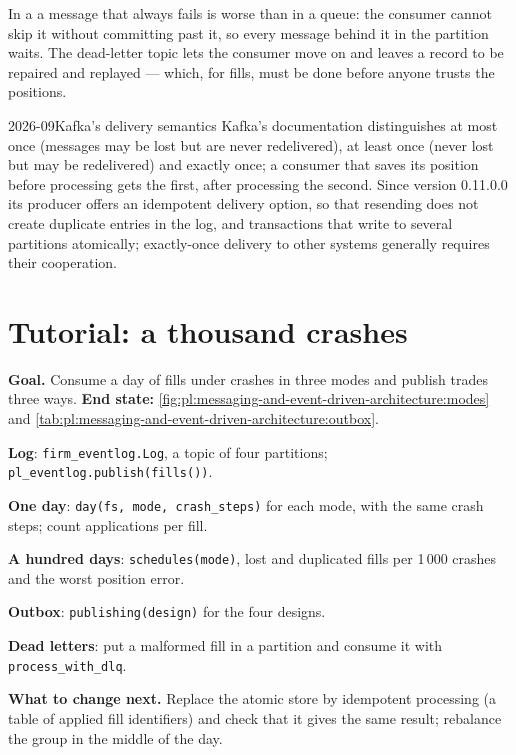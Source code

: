 In a  a message that always fails is worse than in a queue: the consumer cannot skip it without committing past it, so every
message behind it in the partition waits. The dead-letter topic lets the consumer move on and leaves a record to be repaired and replayed ---
which, for fills, must be done before anyone trusts the positions.

\begin{dated}{2026-09}{Kafka's delivery semantics}\label{dat:pl:messaging-and-event-driven-architecture:kafka}
Kafka's documentation distinguishes at most once (messages may be lost but are never redelivered), at least once (never lost but may be
redelivered) and exactly once; a consumer that saves its position before processing gets the first, after processing the second. Since version
0.11.0.0 its producer offers an idempotent delivery option, so that resending does not create duplicate entries in the log, and transactions
that write to several partitions atomically; exactly-once delivery to other systems generally requires their cooperation.
\end{dated}

\section{Tutorial: a thousand crashes}\label{tut:pl:messaging-and-event-driven-architecture:tut}

\begin{tutorial}
\textbf{Goal.} Consume a day of fills under crashes in three modes and publish trades three ways. \textbf{End state:}
\cref{fig:pl:messaging-and-event-driven-architecture:modes} and \cref{tab:pl:messaging-and-event-driven-architecture:outbox}.
\begin{tutsteps}
\item \textbf{Log}: \texttt{firm\_eventlog.Log}, a topic of four partitions; \texttt{pl\_eventlog.publish(fills())}.
\item \textbf{One day}: \texttt{day(fs, mode, crash\_steps)} for each mode, with the same crash steps; count applications per fill.
\item \textbf{A hundred days}: \texttt{schedules(mode)}, lost and duplicated fills per 1\,000 crashes and the worst position error.
\item \textbf{Outbox}: \texttt{publishing(design)} for the four designs.
\item \textbf{Dead letters}: put a malformed fill in a partition and consume it with \texttt{process\_with\_dlq}.
\end{tutsteps}
\textbf{What to change next.} Replace the atomic store by idempotent processing (a table of applied fill identifiers) and check that it gives
the same result; rebalance the group in the middle of the day.
\end{tutorial}


